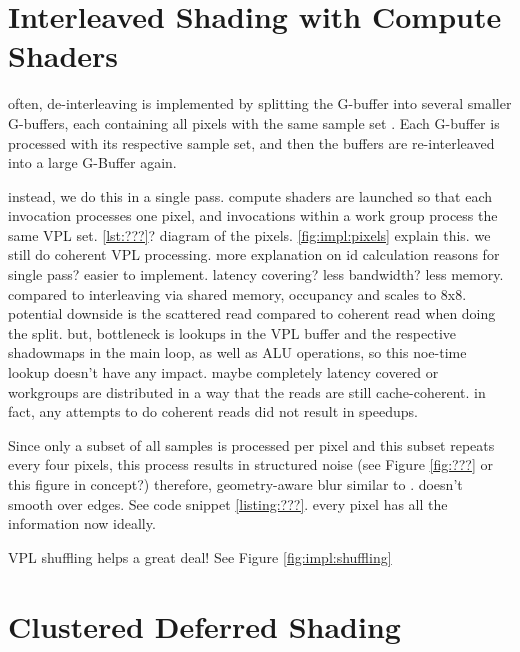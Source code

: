 
\section{Interleaved Shading with Compute Shaders}
\label{sec:impl:interleavedShading}
\begin{outline}
\1 often, de-interleaving is implemented by splitting the G-buffer into several smaller G-buffers, each containing all pixels with the same sample set \cite{segovia2006non}. Each G-buffer is processed with its respective sample set, and then the buffers are re-interleaved into a large G-Buffer again.

\1 instead, we do this in a single pass. compute shaders are launched so that each invocation processes one pixel, and invocations within a work group process the same VPL set.
\1 \ref{lst:???}?
\1 diagram of the pixels. \ref{fig:impl:pixels} explain this. we still do coherent VPL processing.
\1 more explanation on id calculation
\1 reasons for single pass? easier to implement. latency covering? less bandwidth? less memory. compared to interleaving via shared memory, occupancy and scales to 8x8.
\1 potential downside is the scattered read compared to coherent read when doing the split. but, bottleneck is lookups in the VPL buffer and the respective shadowmaps in the main loop, as well as ALU operations, so this noe-time lookup doesn't have any impact. maybe completely latency covered or workgroups are distributed in a way that the reads are still cache-coherent.
\1 in fact, any attempts to do coherent reads did not result in speedups.

\1 Since only a subset of all samples is processed per pixel and this subset repeats every four pixels, this process results in structured noise (see Figure \ref{fig:???} or this figure in concept?)
\1 therefore, geometry-aware blur similar to \citet{laine2007incremental}. doesn't smooth over edges. See code snippet \ref{listing:???}. every pixel has all the information now ideally.

\1 VPL shuffling helps a great deal! See Figure \ref{fig:impl:shuffling}
\end{outline}

\section{Clustered Deferred Shading}
\label{sec:impl:clusteredShading}

